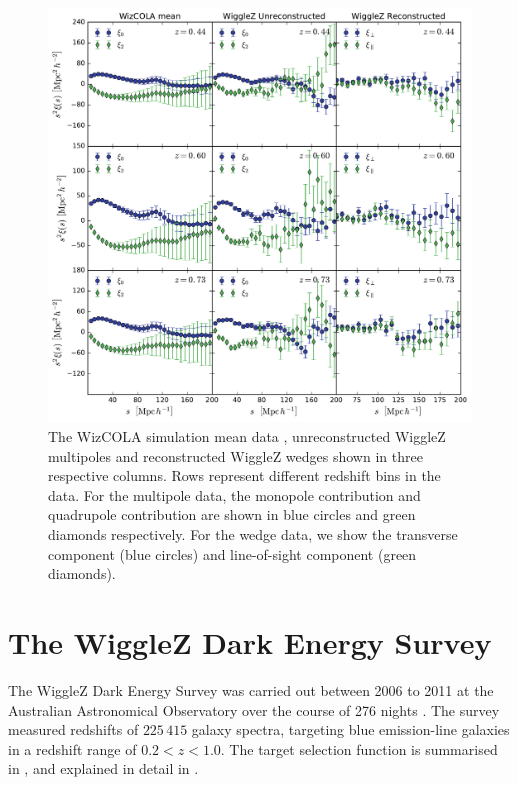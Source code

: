 \documentclass[iop,twocolappendix]{emulateapj}
\begin{document}
\begin{figure}[t]
	\begin{center}
		\includegraphics[width=\textwidth]{images/dataplot.pdf}
	\end{center}
	\caption{The WizCOLA simulation mean data \citep{KazinKoda2014,KodaBlake2015}, unreconstructed WiggleZ multipoles and reconstructed WiggleZ wedges shown in three respective columns. Rows represent different redshift bins in the data. For the multipole data, the monopole contribution and quadrupole contribution are shown in blue circles and green diamonds respectively. For the wedge data, we show the transverse component (blue circles) and line-of-sight component (green diamonds).}
	\label{fig:wizcola}
\end{figure}


\section{The WiggleZ Dark Energy Survey}\label{sect:wigglez}

The WiggleZ Dark Energy Survey was carried out between 2006 to 2011 at the Australian Astronomical Observatory over the course of 276 nights \citep{Drinkwater2010}. The survey measured redshifts of $225\,415$ galaxy spectra, targeting blue emission-line galaxies in a redshift range of $0.2 < z < 1.0$. The target selection function is summarised in \citet{BlakeDavis2011}, and explained in detail in \citet{BlakeBrough2010}. 
\end{document}
